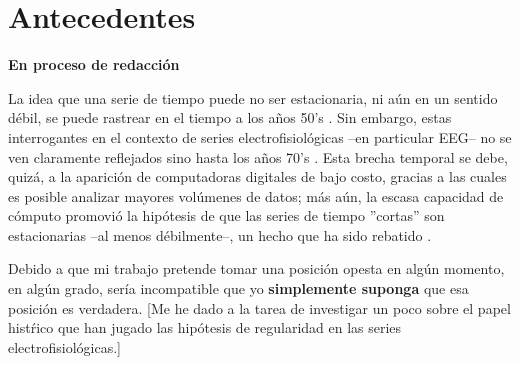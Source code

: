 \chapter{Antecedentes}

\textbf{En proceso de redacci\'on}

La idea que una serie de tiempo puede no ser estacionaria, ni a\'un en un sentido d\'ebil, 
se puede rastrear en el tiempo a los a\~nos 50’s \cite{Page52,Silverman57}. 
Sin embargo, estas interrogantes en el contexto de series electrofisiol\'ogicas --en particular 
EEG-- no se ven claramente reflejados sino hasta los años 70’s 
\cite{Kawabata73,McEwen75,Cohen77,Sugimoto78}.
Esta brecha temporal se debe, quiz\'a, a la aparici\'on de computadoras digitales de bajo costo, 
gracias a las cuales es posible analizar mayores volúmenes de datos; m\'as a\'un, la escasa 
capacidad de c\'omputo promovi\'o la hip\'otesis de que las series de tiempo 
''cortas'' son estacionarias --al menos d\'ebilmente--, un hecho que ha sido 
rebatido \cite{Melard89,Adak98,Klonowski09}.



%

Debido a que mi trabajo pretende tomar una posici\'on opesta en alg\'un momento, en alg\'un grado,
ser\'ia incompatible que yo \textbf{simplemente suponga} que esa posici\'on es verdadera.
[Me he dado a la tarea de investigar un poco sobre el papel hist\'rico que han jugado las
hip\'otesis de regularidad en las series electrofisiol\'ogicas.]


